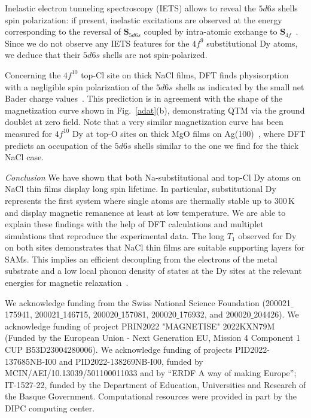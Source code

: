 {Inelastic electron tunneling spectroscopy (IETS) allows to  reveal the $5d6s$ shells spin polarization: if present, inelastic excitations are observed at the energy corresponding to the reversal of $\boldsymbol{S}_{5d6s}$ coupled by intra-atomic exchange to $\boldsymbol{S}_{4f}$~\cite{piv20}. Since we do not observe any IETS features for the $4f^9$ substitutional Dy atoms, we deduce that their $5d6s$ shells are not spin-polarized.

Concerning the $4f^{10}$ top-Cl site on thick NaCl films, DFT finds physisorption with a negligible spin polarization of the $5d6s$ shells as indicated by the small net Bader charge values~\cite{SM}. This prediction is in agreement with the shape of the magnetization curve shown in Fig.~\ref{adat}(b), demonstrating QTM via the ground doublet at zero field.
Note that a very similar magnetization curve has been measured for $4f^{10}$ Dy at top-O sites on thick MgO films on Ag(100)~\cite{don21}, where DFT predicts an occupation of the $5d6s$ shells similar to the one we find for the thick NaCl case.

\textit{Conclusion}\textemdash
We have shown that both Na-substitutional and top-Cl Dy atoms on NaCl thin films display long spin lifetime. In particular, substitutional Dy represents the first system where single atoms are thermally stable up to 300\,K and display magnetic remanence at least at low temperature. We are able to explain these findings with the help of DFT calculations and multiplet simulations that reproduce the experimental data. The long $T_1$ observed for Dy on both sites demonstrates that NaCl thin films are suitable supporting layers for SAMs. This implies an efficient decoupling from the electrons of the metal substrate and a low local phonon density of states at the Dy sites at the relevant energies for magnetic relaxation~\cite{don20,bib:garai23,kra23}.



\begin{acknowledgments}
We acknowledge funding from the Swiss National Science Foundation
(200021$\_$175941, 200021$\_$146715, 200020$\_$157081, 200020$\_$176932, and 200020$\_$204426).
We acknowledge funding of project PRIN2022 "MAGNETISE" 2022KXN79M (Funded by the European Union - Next Generation EU, Mission 4 Component 1 CUP B53D23004280006).
We acknowledge funding of projects PID2022-137685NB-I00 and PID2022-138269NB-I00, funded by MCIN/AEI/10.13039/501100011033 and by ``ERDF A way of making Europe''; IT-1527-22, funded by the Department of Education, Universities and Research of the Basque Government. Computational resources were provided in part by the DIPC computing center.
\end{acknowledgments}




}
